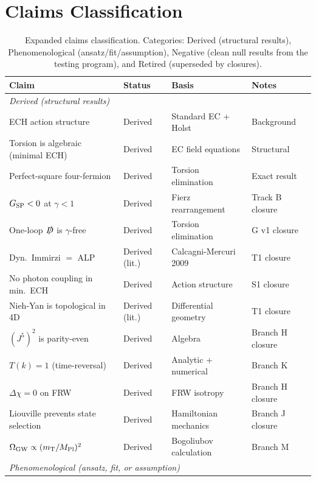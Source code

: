\documentclass[aps,prd,twocolumn,superscriptaddress,showpacs,preprintnumbers,
  nofootinbib,longbibliography,floatfix]{revtex4-2}
\newcommand{\MPl}{M_{\rm Pl}}
\newcommand{\BI}{\gamma}
\newcommand{\Gsp}{G_{\rm SP}}
\newcommand{\OmGW}{\Omega_{\rm GW}}
\newcommand{\mT}{m_{\rm T}}
\begin{document}
\section{Claims Classification}\label{app:claims}

\begin{table}[t]
\caption{\label{tab:claims} Expanded claims classification. Categories:
Derived (structural results), Phenomenological (ansatz/fit/assumption),
Negative (clean null results from the testing program), and
Retired (superseded by closures).}
\begin{ruledtabular}
\begin{tabular}{llll}
\textbf{Claim} & \textbf{Status} & \textbf{Basis} & \textbf{Notes} \\
\hline
\multicolumn{4}{l}{\textit{Derived (structural results)}} \\
ECH action structure & Derived & Standard EC + Holst & Background \\
Torsion is algebraic (minimal ECH) & Derived & EC field equations & Structural \\
Perfect-square four-fermion & Derived & Torsion elimination & Exact result \\
$\Gsp < 0$ at $\BI < 1$ & Derived & Fierz rearrangement & Track B closure \\
One-loop $\slashed{D}$ is $\BI$-free & Derived & Torsion elimination & G v1 closure \\
Dyn.\ Immirzi $=$ ALP & Derived (lit.) & Calcagni-Mercuri 2009 & T1 closure \\
No photon coupling in min.\ ECH & Derived & Action structure & S1 closure \\
Nieh-Yan is topological in 4D & Derived (lit.) & Differential geometry & T1 closure \\
$(J^5)^2$ is parity-even & Derived & Algebra & Branch H closure \\
$T(k) = 1$ (time-reversal) & Derived & Analytic + numerical & Branch K \\
$\Delta\chi = 0$ on FRW & Derived & FRW isotropy & Branch H closure \\
Liouville prevents state selection & Derived & Hamiltonian mechanics & Branch J closure \\
$\OmGW \propto (\mT/\MPl)^2$ & Derived & Bogoliubov calculation & Branch M \\
\hline
\multicolumn{4}{l}{\textit{Phenomenological (ansatz, fit, or assumption)}} \\

\end{tabular}
\end{ruledtabular}
\end{table}
\end{document}
